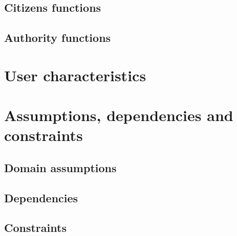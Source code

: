\documentclass[a4paper, hidelinks, 12pt]{report}
\begin{document}
            \subsection{Citizens functions}\label{subsec:citizen-functions}
            \subsection{Authority functions}\label{subsec:authority-functions}
        \section{User characteristics}\label{sec:user-characteristics}
        \section{Assumptions, dependencies and constraints}\label{sec:assumptions,-dependencies-and-constraints}
            \subsection{Domain assumptions}\label{subsec:domain-assumpiton}
            \subsection{Dependencies}\label{subsec:dependencies}
            \subsection{Constraints}\label{subsec:constraints}
\end{document}
